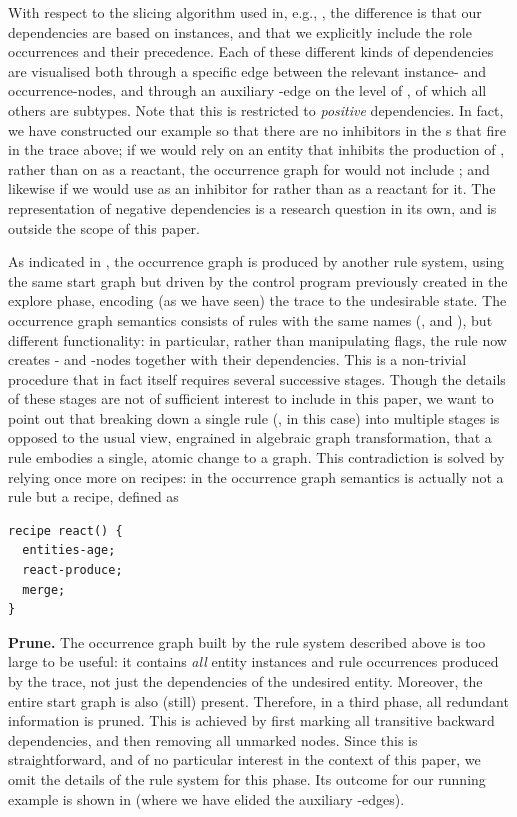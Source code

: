 %
With respect to the slicing algorithm used in, e.g., \cite{datamod2023,DBLP:journals/nc/BrodoBF24}, the difference is that our dependencies are based on instances, and that we explicitly include the role occurrences and their precedence. Each of these different kinds of dependencies are visualised both through a specific edge between the relevant instance- and occurrence-nodes, and through an auxiliary \depends-edge on the level of \TreeNode, of which all others are subtypes. Note that this is restricted to \emph{positive} dependencies. In fact, we have constructed our example so that there are no inhibitors in the \Rule{}s that fire in the trace above; if we would rely on an entity \milk that inhibits the production of \espresso, rather than on \nomilk as a reactant, the occurrence graph for \bang would not include \milk; and likewise if we would use \cappuccino as an inhibitor for \anger rather than \espresso as a reactant for it. The representation of negative dependencies is a research question in its own, and is outside the scope of this paper.

As indicated in , the occurrence graph is produced by another \GROOVE rule system, using the same start graph but driven by the control program previously created in the explore phase, encoding (as we have seen) the trace to the undesirable state. The occurrence graph semantics consists of rules with the same names (\reactR, \contextR and \firedR), but different functionality: in particular, rather than manipulating \present flags, the \reactR rule now creates \RuleOcc- and \EntityInst-nodes together with their dependencies. This is a non-trivial procedure that in fact itself requires several successive stages. Though the details of these stages are not of sufficient interest to include in this paper, we want to point out that breaking down a single rule (\reactR, in this case) into multiple stages is opposed to the usual view, engrained in algebraic graph transformation, that a rule embodies a single, atomic change to a graph. This contradiction is solved by relying once more on \GROOVE recipes: in the occurrence graph semantics \reactR is actually not a rule but a recipe, defined as

\begin{center}
\begin{lstlisting}[]
recipe react() {
  entities-age;
  react-produce;
  merge;
}
\end{lstlisting}
\end{center}
%
\medskip\noindent\textbf{Prune.}
%
The occurrence graph built by the rule system described above is too large to be useful: it contains \emph{all} entity instances and rule occurrences produced by the trace, not just the dependencies of the undesired \Forbidden entity. Moreover, the entire start graph is also (still) present. Therefore, in a third phase, all redundant information is pruned. This is achieved by first marking all transitive backward dependencies, and then removing all unmarked nodes. Since this is straightforward, and of no particular interest in the context of this paper, we omit the details of the \GROOVE rule system for this phase. Its outcome for our running example is shown in  (where we have elided the auxiliary \depends-edges).


